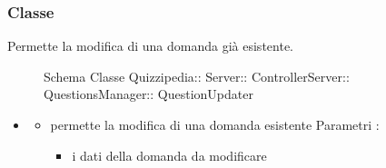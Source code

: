 \subsubsection{Classe }
Permette la modifica di una domanda già esistente.
\begin{figure}[H]
\centering
\noindent{}
\caption[Schema Classe QuestionUpdater]{Schema Classe Quizzipedia:: Server:: ControllerServer:: QuestionsManager:: QuestionUpdater}
\end{figure}
\begin{itemize}
\item {}
\begin{itemize}
\item {}
\newline
permette la modifica di una domanda esistente
\newline
Parametri :
\begin{itemize}
\item {}
\newline
i dati della domanda da modificare
\end{itemize}
\end{itemize}
\end{itemize}
